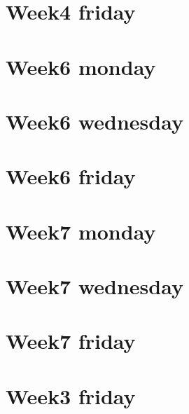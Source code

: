\section*{Week4 friday}

\vfill
\section*{Week6 monday}

\vfill
\section*{Week6 wednesday}

\vfill
\section*{Week6 friday}

\vfill
\section*{Week7 monday}

\vfill
\section*{Week7 wednesday}

\vfill
\section*{Week7 friday}

\vfill
\section*{Week3 friday}

\vfill
